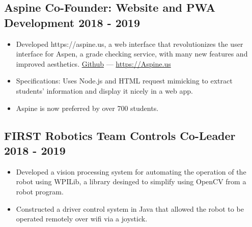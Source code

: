 \documentclass{article}
\begin{document}
\subsection{Aspine Co-Founder: Website and PWA Development \hfill 2018 - 2019}
\begin{itemize}[leftmargin=0.5in]
  \setlength\itemsep{0.00em}
  \item Developed https://aspine.us, a web interface that revolutionizes the user interface for Aspen, a grade checking service, with many new features and improved aesthetics. \href{https://github.com/Aspine/aspine}{Github} --- \href{https://aspine.us}{https://Aspine.us}
  \item Specifications: Uses Node.js and HTML request mimicking to extract students’ information and display it nicely in a web app.
  \item Aspine is now preferred by over 700 students.
\end{itemize}

\subsection{FIRST Robotics Team Controls Co-Leader \hfill 2018 - 2019}
\begin{itemize}[leftmargin=0.5in]
  \setlength\itemsep{0.00em}
  \item Developed a vision processing system for automating the operation of the robot using WPILib, a library desinged to simplify using OpenCV from a robot program.
  \item Constructed a driver control system in Java that allowed the robot to be operated remotely over wifi via a joystick.
\end{itemize}

\end{document}
